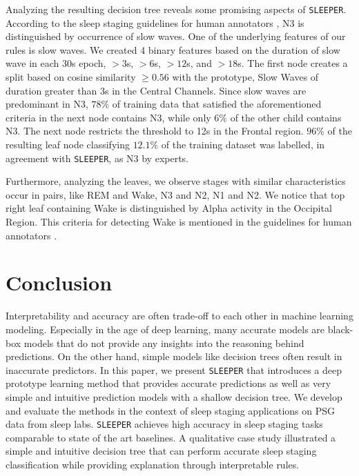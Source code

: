 \documentclass[pmlr]{jmlr}
\newcommand{\mname}
{\texttt{SLEEPER}\xspace}
\begin{document}
Analyzing the resulting decision tree reveals some promising aspects of \mname. According to the sleep staging guidelines for human annotators \citep{berry2012aasm}, N3 is distinguished by occurrence of slow waves. One of the underlying features of our rules is slow waves. We created 4 binary features based on the duration of slow wave in each 30s epoch, $>3$s, $>6$s, $>12$s, and $>18$s. The first node creates a split based on cosine similarity $\ge 0.56$ with the prototype, Slow Waves of duration greater than 3s in the Central Channels. Since slow waves are predominant in N3, $78\%$ of training data that satisfied the aforementioned criteria in the next node contains N3, while only $6\%$ of the other child contains N3. The next node restricts the threshold to 12s in the Frontal region. $96\%$ of the resulting leaf node classifying $12.1\%$ of the training dataset was labelled, in agreement with \mname, as N3 by experts.

Furthermore, analyzing the leaves, we observe stages with similar characteristics occur in pairs, like REM and Wake, N3 and N2, N1 and N2. We notice that top right leaf containing Wake is distinguished by Alpha activity in the Occipital Region. This criteria for detecting Wake is mentioned in the guidelines for human annotators \citep{berry2012aasm}.






 






\section{Conclusion}
Interpretability and accuracy are often trade-off to each other in machine learning modeling. Especially in the age of deep learning, many accurate models are black-box models that do not provide any insights into the reasoning behind predictions. On the other hand, simple models like decision trees often result in inaccurate predictors. In this paper, we present \mname that introduces a deep prototype learning method that provides accurate predictions as well as very simple and intuitive prediction models with a shallow decision tree. We develop and evaluate the methods in the context of sleep staging applications on PSG data from sleep labs. \mname achieves high accuracy in sleep staging tasks comparable to state of the art baselines. A qualitative case study illustrated a simple and intuitive decision tree that can perform accurate sleep staging classification while providing explanation through interpretable rules. 
\end{document}
